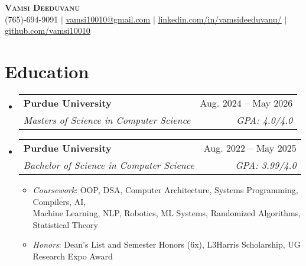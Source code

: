 \documentclass[letterpaper,11pt]{article}
\makeatletter
\newcommand{\resumeItem}[1]{
  \item\small{
    {#1 \vspace{-2pt}}
  }
}
\newcommand{\resumeSubheading}[4]{
  \vspace{-2pt}\item
    \begin{tabular*}{0.97\textwidth}[t]{l@{\extracolsep{\fill}}r}
      \textbf{\small#1} & \small#2 \\
      \textit{\small#3} & \textit{\small #4} \\
    \end{tabular*}\vspace{-7pt}
}
\newcommand{\resumeSubHeadingListStart}{\begin{itemize}[leftmargin=0.15in, label={}]}
\newcommand{\resumeSubHeadingListEnd}{\end{itemize}}
\newcommand{\resumeItemListStart}{\begin{itemize}}
\newcommand{\resumeItemListEnd}{\end{itemize}\vspace{-6pt}}
\makeatother
\begin{document}
\begin{center}
    \textbf{\Huge \scshape Vamsi Deeduvanu} \\ \vspace{1pt}
    \small (765)-694-9091 $|$ \href{mailto:vamsi10010@gmail.com}{\underline{vamsi10010@gmail.com}} $|$ 
    \href{https://www.linkedin.com/in/vamsideeduvanu}{\underline{linkedin.com/in/vamsideeduvanu/}} $|$
    \href{https://github.com/vamsi10010}{\underline{github.com/vamsi10010}}
\end{center}


\vspace{-14pt}
\section{Education}
  \resumeSubHeadingListStart
    \resumeSubheading
      {Purdue University}{Aug. 2024 -- May 2026}
      {Masters of Science in Computer Science}{\textit{GPA}: 4.0/4.0}
    \resumeSubheading
      {Purdue University}{Aug. 2022 -- May 2025}
      {Bachelor of Science in Computer Science}{\textit{GPA}: 3.99/4.0}
      \resumeItemListStart
        \resumeItem{\textit{Coursework}: OOP, DSA, Computer Architecture, Systems Programming, Compilers, AI, \\Machine Learning, NLP, Robotics, ML Systems, Randomized Algorithms, Statistical Theory
        }
        \resumeItem{\textit{Honors}: Dean's List and Semester Honors (6x), L3Harris Scholarship, UG Research Expo Award}
      \resumeItemListEnd
  \resumeSubHeadingListEnd


\end{document}
